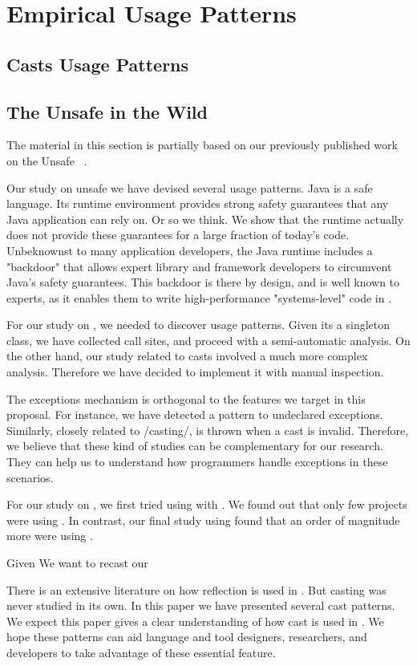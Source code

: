 
\chapter{Empirical Usage Patterns}
\label{cha:proposal}


\section{Casts Usage Patterns}

\section{The \java{} Unsafe \api{} in the Wild}

The material in this section is partially based on our previously published work on the Unsafe \api{}~\cite{mastrangeloUseYourOwn2015}.

Our study on unsafe we have devised several usage patterns.
Java is a safe language.
Its runtime environment provides strong safety guarantees that any Java application can rely on.
Or so we think.
We show that the runtime actually does not provide these guarantees for a large fraction of today's \java{} code.
Unbeknownst to many application developers, the Java runtime includes a "backdoor" that allows expert library and framework developers to circumvent Java's safety guarantees.
This backdoor is there by design, and is well known to experts, as it enables them to write high-performance "systems-level" code in \java{}.

For our study on \smu{}, we needed to discover usage patterns.
Given its a singleton class, we have collected call sites, and proceed with a semi-automatic analysis.
On the other hand, our study related to casts involved a much more complex analysis.
Therefore we have decided to implement it with manual inspection.

The exceptions mechanism is orthogonal to the features we target in this proposal.
For instance, we have detected a \smu{} pattern to \throw{} undeclared exceptions.
Similarly, closely related to /casting/, \cce{} is thrown when a cast is invalid.
Therefore, we believe that these kind of studies can be complementary for our research.
They can help us to understand how programmers handle exceptions in these scenarios.

For our study on \smu{}, we first tried using \boa{} with \sourceforge{}.
We found out that only few projects were using \smu{}.
In contrast, our final study using \maven{} found that an order of magnitude more were using \smu{}.

Given 
We want to recast our 



There is an extensive literature on how reflection is used in \java{}.
But casting was never studied in its own.
In this paper we have presented several cast patterns.
We expect this paper gives a clear understanding of how cast is used in \java{}.
We hope these patterns can aid language and tool designers,
researchers, and developers to take advantage of these essential feature.